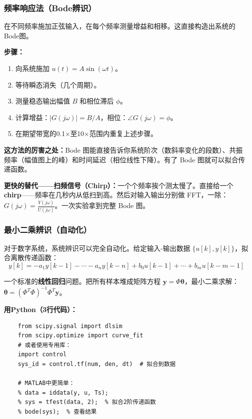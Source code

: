 \subsubsection{频率响应法（Bode辨识）}

在不同频率施加正弦输入，在每个频率测量增益和相移。这直接构造出系统的Bode图。

\textbf{步骤：}
\begin{enumerate}
    \item 向系统施加 $u(t) = A \sin(\omega t)$。
    \item 等待瞬态消失（几个周期）。
    \item 测量稳态输出幅值 $B$ 和相位滞后 $\phi$。
    \item 计算增益：$|G(j\omega)| = B/A$，相位：$\angle G(j\omega) = \phi$。
    \item 在期望带宽的0.1$\times$至10$\times$范围内重复上述步骤。
\end{enumerate}

\textbf{这方法的厉害之处：}Bode 图能直接告诉你系统阶次（数斜率变化的段数）、共振频率（幅值图上的峰）和时间延迟（相位线性下降）。有了 Bode 图就可以拟合传递函数。

\textbf{更快的替代——扫频信号（Chirp）：}一个个频率挨个测太慢了。直接给一个\textbf{chirp}——频率在几秒内从低扫到高。然后对输入输出分别做 FFT，一除：$G(j\omega) = \frac{Y(j\omega)}{U(j\omega)}$。一次实验拿到完整 Bode 图。

\subsubsection{最小二乘辨识（自动化）}

对于数字系统，系统辨识可以完全自动化。给定输入-输出数据 $\{u[k], y[k]\}$，拟合离散传递函数：
\begin{equation}
y[k] = -a_1 y[k{-}1] - \cdots - a_n y[k{-}n] + b_0 u[k{-}1] + \cdots + b_m u[k{-}m{-}1]
\end{equation}

一个标准的\textbf{线性回归}问题。把所有样本堆成矩阵方程 $\mathbf{y} = \Phi \boldsymbol{\theta}$，最小二乘求解：$\boldsymbol{\theta} = (\Phi^T \Phi)^{-1} \Phi^T \mathbf{y}$。

\textbf{用Python（3行代码）：}
\begin{verbatim}
    from scipy.signal import dlsim
    from scipy.optimize import curve_fit
    # 或者使用专用库：
    import control
    sys_id = control.tf(num, den, dt)  # 拟合到数据

    # MATLAB中更简单：
    % data = iddata(y, u, Ts);
    % sys = tfest(data, 2);  % 拟合2阶传递函数
    % bode(sys);  % 查看结果
\end{verbatim}

